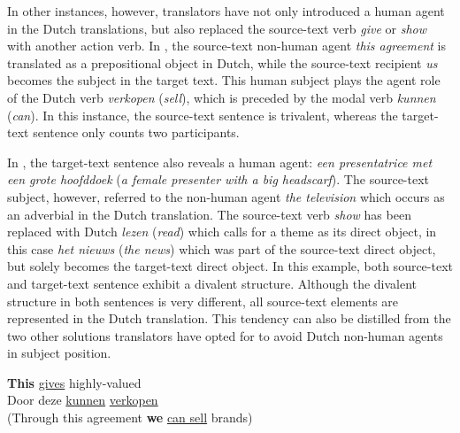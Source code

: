 \documentclass[output=paper]{LSP/langsci}
\begin{document}

In other instances, however, translators have not only introduced a human agent in the Dutch translations, but also replaced the source-text verb \textit{give} or \textit{show} with another action verb. In , the source-text non-human agent \textit{this agreement} is translated as a prepositional object in Dutch, while the source-text recipient \textit{us} becomes the subject in the target text. This human subject plays the agent role of the Dutch verb \textit{verkopen} (\textit{sell}), which is preceded by the modal verb \textit{kunnen} (\textit{can}). In this instance, the source-text sentence is trivalent, whereas the target-text sentence only counts two participants. 

In , the target-text sentence also reveals a human agent: \textit{een presentatrice met een grote hoofddoek} (\textit{a female presenter with a big headscarf}). The source-text subject, however, referred to the non-human agent \textit{the television} which occurs as an adverbial in the Dutch translation. The source-text verb \textit{show} has been replaced with Dutch \textit{lezen} (\textit{read}) which calls for a theme as its direct object, in this case \textit{het nieuws} (\textit{the news}) which was part of the source-text direct object, but solely becomes the target-text direct object. In this example, both source-text and target-text sentence exhibit a divalent structure. Although the divalent structure in both sentences is very different, all source-text elements are represented in the Dutch translation. This tendency can also be distilled from the two other solutions translators have opted for to avoid Dutch non-human agents in subject position.             


\ea \label{ex:5:13}
\ea
\textbf{This}  \ul{gives}  highly-valued \\[1em]
\ex Door deze  \ul{kunnen}   \ul{verkopen}\\
(Through this agreement \textbf{we} \ul{can sell} brands)
\z
\z
\end{document}
